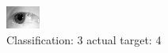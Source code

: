 \begin{figure}[h!]
\begin{center}
\includegraphics[width=0.60\columnwidth]{figures/ID1249_class_3_target_4.png}
\end{center}
\caption{ Classification: 3 actual target: 4}
\label{fig:ID1249_class_3_target_4}
\end{figure}
